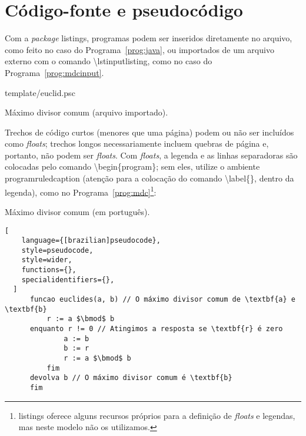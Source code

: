 
\chapter{Código-fonte e pseudocódigo}
\label{ap:pseudocode}

Com a \textit{package} \textsf{listings}, programas podem ser inseridos
diretamente no arquivo, como feito no caso do Programa~\ref{prog:java},
ou importados de um arquivo externo com o comando
\textsf{\textbackslash{}lstinputlisting}, como no caso
do Programa~\ref{prog:mdcinput}.

\begin{program}
  
  {template/euclid.psc}

  \caption{Máximo divisor comum (arquivo importado).\label{prog:mdcinput}}
\end{program}

Trechos de código curtos (menores que uma página) podem ou não ser
incluídos como \textit{floats}; trechos longos necessariamente incluem
quebras de página e, portanto, não podem ser \textit{floats}. Com
\textit{floats}, a legenda e as linhas separadoras são colocadas pelo
comando \textsf{\textbackslash{}begin\{program\}}; sem eles, utilize o
ambiente \textsf{programruledcaption} (atenção para a colocação do
comando \textsf{\textbackslash{}label\{\}}, dentro da legenda), como
no Programa~\ref{prog:mdc}\footnote{\textsf{listings} oferece alguns
recursos próprios para a definição de \textit{floats} e legendas, mas
neste modelo não os utilizamos.}:

\begin{programruledcaption}{Máximo divisor comum (em português).\label{prog:mdc}}
  \begin{lstlisting}[
    language={[brazilian]pseudocode},
    style=pseudocode,
    style=wider,
    functions={},
    specialidentifiers={},
  ]
      funcao euclides(a, b) // O máximo divisor comum de \textbf{a} e \textbf{b}
          r := a $\bmod$ b
	  enquanto r != 0 // Atingimos a resposta se \textbf{r} é zero
              a := b
              b := r
              r := a $\bmod$ b
          fim
	  devolva b // O máximo divisor comum é \textbf{b}
      fim
  \end{lstlisting}
\end{programruledcaption}

